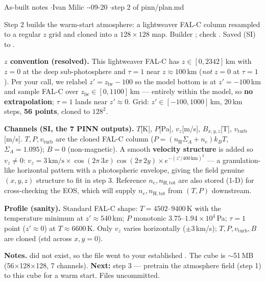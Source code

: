 


%
{As-built notes \quad$\cdot$\quad Ivan Milic \quad$\cdot$-09-20 \quad$\cdot$\quad step 2 of pinn/plan.md}

Step 2 builds the warm-start atmosphere: a lightweaver FAL-C column resampled to a regular $z$ grid and
cloned into a $128\times128$ map. Builder ; check
. Saved (SI) to
.

\textbf{$z$ convention (resolved).} This lightweaver FAL-C has $z\in[0,2342]$\,km with $z=0$ at the deep
sub-photosphere and $\tau{=}1$ near $z\approx100$\,km (\emph{not} $z{=}0$ at $\tau{=}1$). Per your call, we
relabel $z' = z_\mathrm{lw}-100$ so the model bottom is at $z'=-100$\,km and sample FAL-C over
$z_\mathrm{lw}\in[0,1100]$\,km --- entirely within the model, so \textbf{no extrapolation}; $\tau{=}1$ lands
near $z'\approx0$. Grid: $z'\in[-100,1000]$\,km, $20$\,km steps, \textbf{56 points}, cloned to $128^2$.

\textbf{Channels (SI, the 7 PINN outputs).} $T$[K], $P$[Pa], $v_z$[m/s], $B_{x,y,z}$[T], $v_\mathrm{turb}$[m/s].
$T,P,v_\mathrm{turb}$ are the cloned FAL-C column ($P=(n_\mathrm{H}\Sigma_A+n_e)k_BT$, $\Sigma_A{=}1.095$); $B{=}0$
(non-magnetic). A smooth \textbf{velocity structure} is added so $v_z\neq0$:
$v_z = 3\,\text{km/s}\times\cos(2\pi\,3x)\cos(2\pi\,2y)\times e^{-(z'/400\,\text{km})^2}$ --- a granulation-like
horizontal pattern with a photospheric envelope, giving the field genuine $(x,y,z)$ structure to fit in step 3.
Reference $n_e,n_\mathrm{H,tot}$ are also stored (1-D) for cross-checking the EOS, which will supply
$n_e,n_\mathrm{H,tot}$ from $(T,P)$ downstream.

\textbf{Profile (sanity).} Standard FAL-C shape: $T=4502$--$9400$\,K with the temperature minimum at
$z'\approx540$\,km; $P$ monotonic $3.75$--$1.94\times10^{4}$\,Pa; $\tau{=}1$ point ($z'{\approx}0$) at
$T\approx6600$\,K. Only $v_z$ varies horizontally ($\pm3$\,km/s); $T,P,v_\mathrm{turb},B$ are cloned
(std across $x,y=0$).

\textbf{Notes.}  did not exist, so the file went to your established . The
cube is $\sim$51\,MB (56$\times$128$\times$128, 7 channels). \textbf{Next:} step 3 --- pretrain the
atmosphere field (step 1) to this cube for a warm start. Files uncommitted.



